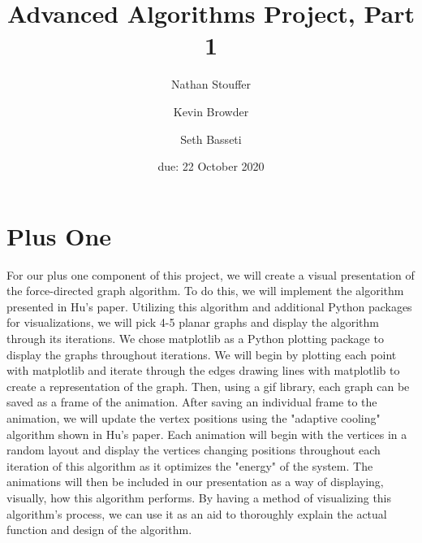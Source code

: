 \documentclass{article}
\title{Advanced Algorithms Project, Part 1}
\author{Nathan Stouffer \and Kevin Browder \and Seth Basseti}
\date{due: 22 October 2020}
\begin{document}
\maketitle





\section{Plus One}
For our plus one component of this project, we will create a visual presentation of the force-directed graph algorithm. 
To do this, we will implement the algorithm presented in Hu's paper. Utilizing this algorithm and additional Python packages for visualizations,
we will pick 4-5 planar graphs and display the algorithm through its iterations. We chose matplotlib as a Python plotting package
to display the graphs throughout iterations. We will begin by plotting each point with matplotlib and iterate through
the edges drawing lines with matplotlib to create a representation of the graph. Then, using a gif library, each graph can be saved as a frame
of the animation. After saving an individual frame to the animation, we will update the vertex positions using the "adaptive cooling" algorithm shown in Hu's paper. 
Each animation will begin with the vertices in a random layout and display the vertices changing positions throughout each iteration of this algorithm
as it optimizes the "energy" of the system. The animations will then be included in our presentation as a way of displaying,
visually, how this algorithm performs. By having a method of visualizing this algorithm's process, we can use it as an aid to
thoroughly explain the actual function and design of the algorithm.

\newpage


\end{document}

